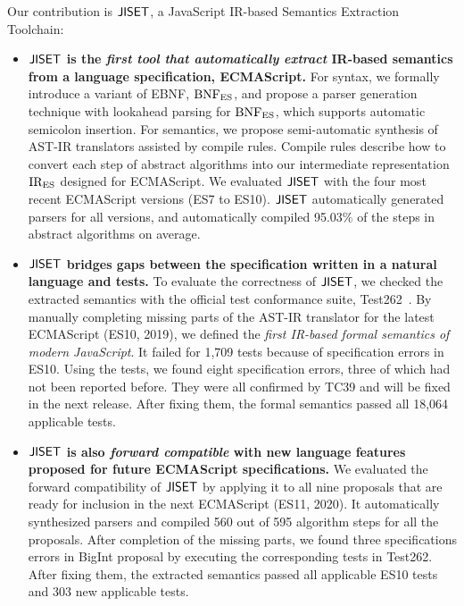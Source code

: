Our contribution is \( \text{\sf JISET} \), a JavaScript IR-based Semantics Extraction
Toolchain:
\begin{itemize}[leftmargin=0.5cm]
  \item \textbf{\( \text{\sf JISET} \) is the \textit{first tool that automatically
    extract} IR-based semantics from a language specification, ECMAScript.}
    For syntax, we formally introduce a variant of EBNF, \( \text{BNF}_{\text{ES}} \),
    and propose a parser generation technique with
    lookahead parsing for \( \text{BNF}_{\text{ES}} \), which supports automatic semicolon
    insertion. For semantics, we propose semi-automatic synthesis of AST-IR
    translators assisted by compile rules.  Compile rules describe
    how to convert each step of abstract algorithms into our intermediate
    representation \( \text{IR}_\text{ES} \) designed for ECMAScript. We evaluated \( \text{\sf JISET} \)
    with the four most recent ECMAScript versions (ES7 to ES10).   \( \text{\sf JISET} \)
    automatically generated parsers for all versions, and automatically compiled
    95.03\% of the steps in abstract algorithms on average.
  \item \textbf{\( \text{\sf JISET} \) bridges gaps between the specification written in a
    natural language and tests.}
    To evaluate the correctness of \( \text{\sf JISET} \), we checked the extracted
    semantics with the official test conformance suite, Test262~\cite{test262}.
    By manually completing missing parts of the AST-IR translator for the latest
    ECMAScript (ES10, 2019), we defined the \textit{first IR-based formal
    semantics of modern JavaScript}. It failed for 1,709 tests because of
    specification errors in ES10. Using the tests, we found eight specification errors,
    three of which had not been reported before. They were all confirmed by
    TC39 and will be fixed in the next release.  After fixing them, the formal
    semantics passed all 18,064 applicable tests.
  \item \textbf{\( \text{\sf JISET} \) is also \textit{forward compatible} with new
    language features proposed for future ECMAScript specifications.}
    We evaluated the forward compatibility of \( \text{\sf JISET} \) by applying it to all
    nine proposals that are ready for inclusion in the next ECMAScript
    (ES11, 2020).  It automatically synthesized parsers and compiled 560
    out of 595 algorithm steps for all the proposals.  After completion
    of the missing parts, we found three specifications errors in BigInt
    proposal by executing the corresponding tests in Test262.  After fixing
    them, the extracted semantics passed all applicable ES10 tests and 303 new
    applicable tests.
\end{itemize}
